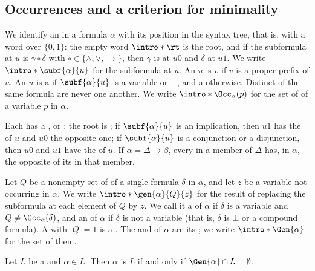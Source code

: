 \subsection{Occurrences and a criterion for minimality}

\AP We identify an  in a formula $\alpha$ with its position
in the syntax tree, that is, with a word over $\{0,1\}$: the empty word
$\intro*\rt$ is the root, and if the subformula at $u$ is $\gamma\circ\delta$
with $\circ\in\{\wedge,\vee,\to\}$, then $\gamma$ is at $u0$ and $\delta$ at
$u1$. We write $\intro*\subf{\alpha}{u}$ for the subformula at $u$. An
 $u$ is  $v$ if $v$ is a proper prefix
of $u$. \AP An  $u$ is a  if $\subf{\alpha}{u}$ is
a variable or $\bot$, and a  otherwise. Distinct
 of the same formula are never  one
another. \AP We write $\intro*\Occ_\alpha(p)$ for the set of 
of a variable $p$ in $\alpha$.

\AP Each  has a ,  or
: the root is ; if $\subf{\alpha}{u}$ is an
implication, then $u1$ has the  of $u$ and $u0$ the opposite
one; if $\subf{\alpha}{u}$ is a conjunction or a disjunction, then $u0$ and
$u1$ have the  of $u$. If $\alpha=\Delta\to\beta$, every
 in a member of $\Delta$ has, in $\alpha$, the opposite of its
 in that member.

\AP Let $Q$ be a nonempty set of  of a single formula $\delta$
in $\alpha$, and let $z$ be a variable not occurring in $\alpha$. We write
$\intro*\gen{\alpha}{Q}{z}$ for the result of replacing the subformula at
each element of $Q$ by $z$. We call it a  of $\alpha$ if
$\delta$ is a variable and $Q\ne\Occ_\alpha(\delta)$, and an
 of $\alpha$ if $\delta$ is not a variable (that is,
$\delta$ is $\bot$ or a compound formula). A  with
$|Q|=1$ is a . \AP The  and
 of $\alpha$ are its ;
we write $\intro*\Gen{\alpha}$ for the set of them.

\begin{proposition}\label{prop:criterion}
Let $L$ be a  and $\alpha\in L$. Then $\alpha$ is 
$L$ if and only if $\Gen{\alpha}\cap L=\emptyset$.
\end{proposition}

